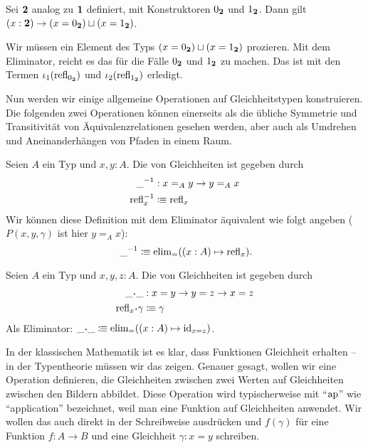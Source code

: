 \begin{bemerkung}
  Sei $\mathbf{2}$ analog zu $\mathbf{1}$ definiert, mit Konstruktoren $0_{\mathbf{2}}$ und $1_{\mathbf{2}}$.
  Dann gilt $(x:\mathbf{2})\to (x=0_{\mathbf{2}})\sqcup (x=1_{\mathbf{2}})$.
\end{bemerkung}
\begin{beweis}
  Wir müssen ein Element des Typs $(x=0_{\mathbf{2}})\sqcup (x=1_{\mathbf{2}})$ prozieren.
  Mit dem Eliminator, reicht es das für die Fälle $0_{\mathbf{2}}$ und $1_{\mathbf{2}}$ zu machen.
  Das ist mit den Termen $\iota_1(\mathrm{refl}_{0_{\mathbf{2}}})$ und $\iota_2(\mathrm{refl}_{1_{\mathbf{2}}})$ erledigt.
\end{beweis}

Nun werden wir einige allgemeine Operationen auf Gleichheitstypen konstruieren.
Die folgenden zwei Operationen können einerseits als die übliche Symmetrie und Transitivität von Äquivalenzrelationen gesehen werden, aber auch als Umdrehen und Aneinanderhängen von Pfaden in einem Raum.

\begin{definition}
  Seien $A$ ein Typ und $x,y:A$.
  Die  von Gleichheiten ist gegeben durch
  \begin{align*}
    \_^{-1} &: x=_Ay\to y=_Ax \\
    \mathrm{refl}_x^{-1}&\vcentcolon\mspace{-1.2mu}\equiv \mathrm{refl}_x 
  \end{align*}
  Wir können diese Definition mit dem Eliminator äquivalent wie folgt angeben ($P(x,y,\gamma)$ ist hier $y=_Ax$):
  \[
     \_^{-1}\colonequiv \elim_=((x:A) \mapsto \refl_x)\rlap{.}
  \]
\end{definition}

\begin{definition}
  Seien $A$ ein Typ und $x,y,z:A$.
  Die  von Gleichheiten ist gegeben durch
  \begin{align*}
    \_\kon\_&:x=y\to y=z\to x=z \\
    \refl_x\kon\gamma &\colonequiv \gamma
  \end{align*}
  Als Eliminator: $\_\kon\_\colonequiv \elim_=((x:A)\mapsto \id_{x=z})$.
\end{definition}

In der klassischen Mathematik ist es klar, dass Funktionen Gleichheit erhalten -- in der Typentheorie müssen wir das zeigen.
Genauer gesagt, wollen wir eine Operation definieren, die Gleichheiten zwischen zwei Werten auf Gleichheiten zwischen den Bildern abbildet.
Diese Operation wird typischerweise mit ``$\mathrm{ap}$'' wie ``application'' bezeichnet, weil man eine Funktion auf Gleichheiten anwendet. 
Wir wollen das auch direkt in der Schreibweise ausdrücken und $f(\gamma)$ für eine Funktion $f:A\to B$ und eine Gleichheit $\gamma:x=y$ schreiben.

